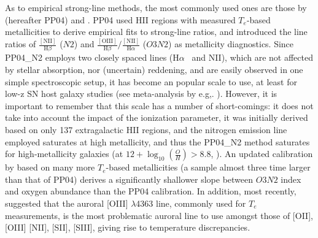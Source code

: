 \documentclass{emulateapj}
\newcommand{\oxab}{\ensuremath{12 + \log_{10}(\frac{O}{H})}}
\newcommand{\ha}{H$\alpha$}
\begin{document}
As to empirical strong-line methods, the most commonly used ones are those by \citet{pettini04} (hereafter PP04) and \citet{pilyugin05}. PP04 used HII regions with measured $T_e$-based metallicities to derive empirical fits to strong-line ratios, and introduced the line ratios of $\frac{\mathrm{[NII]}}{\mathrm{H}\beta}$ ($N2$) and $\frac{\mathrm{[OIII]}}{\mathrm{H}\beta} / \frac{\mathrm{[NII]}}{\mathrm{H}\alpha}$ ($O3N2$) as metallicity diagnostics. Since PP04\_N2 employs two closely spaced lines (\ha~ and NII), which are not affected by stellar absorption, nor (uncertain) reddening, and are easily observed in one simple spectroscopic setup, it has become an popular scale to use, at least for low-z SN host galaxy studies (see meta-analysis by e.g,. \citealt{sanders12,modjaz12_proc,leloudas14}). However, it is important to remember that this scale has a number of short-comings: it does not take into account the impact of the ionization parameter, it was initially derived based on only 137 extragalactic HII regions, and the nitrogen emission line employed saturates at high metallicity, and thus the PP04\_N2 method saturates for high-metallicity galaxies (at $\oxab > 8.8$, \citealt{kewley08}). An updated calibration by \citet{marino13} based on many more $T_e$-based metallicities (a sample almost three time larger than that of PP04) derives a significantly shallower slope between $O3N2$ index and oxygen abundance than the PP04 calibration. In addition, most recently, \citet{berg15} suggested that the auroral [OIII] $\lambda$4363 line, commonly used for $T_e$ measurements, is the most problematic auroral line to use amongst those of [OII], [OIII] [NII], [SII], [SIII], giving rise to temperature discrepancies.
\end{document}
